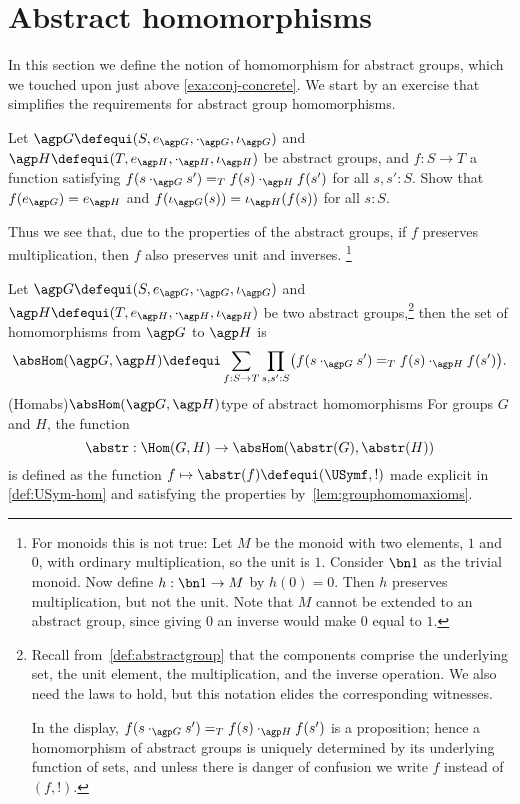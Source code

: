 \section{Abstract homomorphisms}\label{sec:abshom}

In this section we define the notion of homomorphism for
abstract groups, which we touched upon just above
\cref{exa:conj-concrete}. We start by an exercise
that simplifies the requirements for abstract group homomorphisms.

\begin{xca}\label{{xca:onlymult-hom}}
  Let $\agp G\defequi(S,e_{\agp G},\cdot_{\agp G},\iota_{\agp G})$
  and $\agp H\defequi(T,e_{\agp H},\cdot_{\agp H},\iota_{\agp H})$
  be abstract groups, and $f:S\to T$ a function satisfying
  $f(s\cdot_{\agp G}s')=_Tf(s)\cdot_{\agp H}f(s')$ for all $s,s':S$.
  Show that $f(e_{\agp G}) = e_{\agp H}$ and 
  $f(\iota_{\agp G}(s)) = \iota_{\agp H}(f(s))$ for all $s:S$.
\end{xca}

Thus we see that, due to the properties of the abstract groups,
if $f$ preserves multiplication, then $f$ also preserves unit and inverses.%
\footnote{\label{ft:monoid-hom}For monoids this is not true:
  Let $M$ be the monoid with two elements, $1$ and $0$,
  with ordinary multiplication, so the unit is $1$. 
  Consider $\bn1$ as the trivial monoid.
  Now define $h: \bn1\to M$ by $h(0)=0$. Then $h$ preserves
  multiplication, but not the unit. Note that $M$ cannot
  be extended to an abstract group, since giving $0$
  an inverse would make $0$ equal to $1$.}
  
\begin{definition}\label{def:abstrisfunctor}
  Let $\agp G\defequi(S,e_{\agp G},\cdot_{\agp G},\iota_{\agp G})$
  and $\agp H\defequi(T,e_{\agp H},\cdot_{\agp H},\iota_{\agp H})$
  be two abstract groups,\footnote{%
    Recall from~\cref{def:abstractgroup} that the components comprise
    the underlying set, the unit element, the multiplication,
    and the inverse operation. We also need the laws to hold, 
    but this notation elides the corresponding witnesses.

    In the display, 
    $f(s\cdot_{\agp G}s')=_Tf(s)\cdot_{\agp H}f(s')$ is a proposition; 
    hence a homomorphism of abstract groups is uniquely determined
    by its underlying function of sets, and unless there is danger of
    confusion we write $f$ instead of $(f,!)$.}
  then the set of homomorphisms from $\agp G$ to $\agp H$ is
  \[
    \absHom(\agp G,\agp H)
    \defequi\sum_{f:S\to T}
    \prod_{s,s':S}\bigl(f(s\cdot_{\agp G}s')=_Tf(s)\cdot_{\agp H}f(s')\bigr).
  \]
  \glossary(Homabs){$\protect\absHom(\agp G,\agp H)$}{type of abstract homomorphisms}
  For groups $G$ and $H$, the function
  \[
    \abstr:\Hom(G,H)\to\absHom(\abstr(G),\abstr(H))
  \]
  is defined as the function $f\mapsto \abstr(f)\defequi(\USymf,!)$
  made explicit in \cref{def:USym-hom} and satisfying the
  properties by~\cref{lem:grouphomomaxioms}.
\end{definition}

